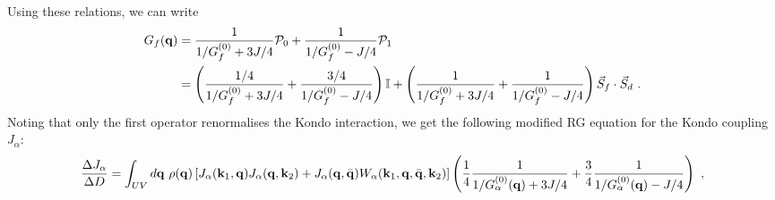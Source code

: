 \documentclass[%
reprint,
superscriptaddress,
groupedaddress,
superscriptaddress,
onecolumn,
10pt
]{revtex4-2}
\begin{document}
Using these relations, we can write
\begin{equation}\begin{aligned}
	G_f({\bf q}) &= \frac{1}{1/G_f^{(0)} + 3J/4}\mathcal{P}_0 + \frac{1}{1/G_f^{(0)} - J/4}\mathcal{P}_1 \\
		&= \left(\frac{1/4}{1/G_f^{(0)} + 3J/4} + \frac{3/4}{1/G_f^{(0)} - J/4}\right)\mathbb{I} + \left(\frac{1}{1/G_f^{(0)} + 3J/4} + \frac{1}{1/G_f^{(0)} - J/4}\right)\vec{S}_f\cdot\vec{S}_d~.
\end{aligned}\end{equation}
Noting that only the first operator renormalises the Kondo interaction, we get the following modified RG equation for the Kondo coupling \(J_\alpha\):
\begin{equation}\begin{aligned}
	\frac{\Delta J_\alpha}{\Delta D} = \int_{UV} d{\bf q} ~\rho({\bf q}) \left[J_\alpha({\bf k}_1, {\bf q})J_\alpha({\bf q}, {\bf k}_2) + J_\alpha({\bf q}, \bar {\bf q})W_\alpha({\bf k}_1, {\bf q}, \bar {\bf q}, {\bf k}_2)\right]\left(\frac{1}{4}\frac{1}{1/G_\alpha^{(0)}({\bf q}) + 3J/4} + \frac{3}{4}\frac{1}{1/G_\alpha^{(0)}({\bf q}) - J/4}\right)~,
\end{aligned}\end{equation}
\end{document}
